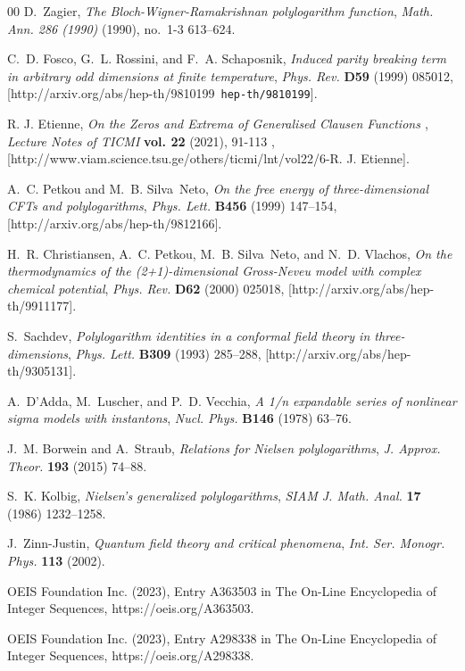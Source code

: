 \documentclass[twoside]{article}
\begin{document}
\begin{thebibliography}{00}
D.~Zagier, {\it {The Bloch-Wigner-Ramakrishnan polylogarithm function}}, {\em Math. Ann. 286 (1990)} (1990), no.~1-3 613--624.

C.~D. Fosco, G.~L. Rossini, and F.~A. Schaposnik, {\it {Induced parity breaking term in arbitrary odd dimensions at finite temperature}},  {\em Phys. Rev.} {\bf D59} (1999) 085012, [{http://arxiv.org/abs/hep-th/9810199}{{\tt
hep-th/9810199}}].


R. J. Etienne, {\it {On the Zeros and Extrema of Generalised Clausen Functions }}, {\em Lecture Notes of  TICMI} {\bf vol. 22} (2021), 91-113 ,
  [{http://www.viam.science.tsu.ge/others/ticmi/lnt/vol22/6-R. J. Etienne}].


A.~C. Petkou and M.~B. Silva~Neto, {\it {On the free energy of three-dimensional CFTs and polylogarithms}}, {\em Phys. Lett.} {\bf B456} (1999) 147--154, [{http://arxiv.org/abs/hep-th/9812166}].

H.~R. Christiansen, A.~C. Petkou, M.~B. Silva~Neto, and N.~D. Vlachos, {\it {On
  the thermodynamics of the (2+1)-dimensional Gross-Neveu model with complex
  chemical potential}}, {\em Phys. Rev.} {\bf D62} (2000) 025018,
  [{http://arxiv.org/abs/hep-th/9911177}].


S.~Sachdev, {\it {Polylogarithm identities in a conformal field theory in three-dimensions}}, {\em Phys. Lett.} {\bf B309} (1993) 285--288, [{http://arxiv.org/abs/hep-th/9305131}].


A.~D'Adda, M.~Luscher, and P.~D. Vecchia, {\it A 1/n expandable series of nonlinear sigma models with instantons}, {\em Nucl. Phys.} {\bf B146} (1978)
  63--76.

J.~M. Borwein and A.~Straub, {\it {Relations for Nielsen polylogarithms}}, {\em J. Approx. Theor.} {\bf 193} (2015) 74--88.

S.~K. Kolbig, {\it Nielsen's generalized polylogarithms}, {\em SIAM J. Math. Anal.} {\bf 17} (1986) 1232--1258.

J.~Zinn-Justin, {\it {Quantum field theory and critical phenomena}},  {\em Int. Ser. Monogr. Phys.} {\bf 113} (2002).

OEIS Foundation Inc. (2023), Entry A363503 in The On-Line Encyclopedia of Integer Sequences, https://oeis.org/A363503.

OEIS Foundation Inc. (2023), Entry A298338 in The On-Line Encyclopedia of Integer Sequences, https://oeis.org/A298338.


\end{thebibliography}
\end{document}
